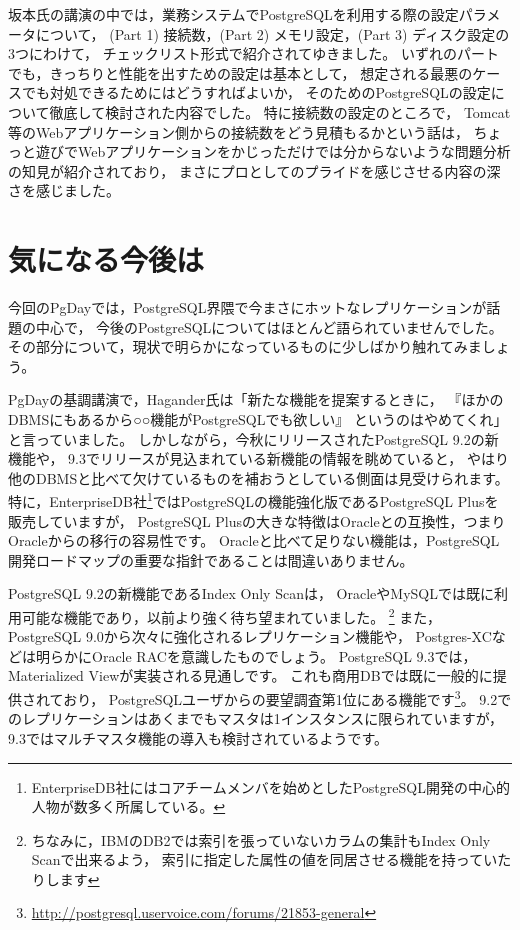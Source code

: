 坂本氏の講演の中では，業務システムでPostgreSQLを利用する際の設定パラメータについて，
(Part 1) 接続数，(Part 2) メモリ設定，(Part 3) ディスク設定の3つにわけて，
チェックリスト形式で紹介されてゆきました。
いずれのパートでも，きっちりと性能を出すための設定は基本として，
想定される最悪のケースでも対処できるためにはどうすればよいか，
そのためのPostgreSQLの設定について徹底して検討された内容でした。
特に接続数の設定のところで，
Tomcat等のWebアプリケーション側からの接続数をどう見積もるかという話は，
ちょっと遊びでWebアプリケーションをかじっただけでは分からないような問題分析の知見が紹介されており，
まさにプロとしてのプライドを感じさせる内容の深さを感じました。

\section{気になる今後は}

今回のPgDayでは，PostgreSQL界隈で今まさにホットなレプリケーションが話題の中心で，
今後のPostgreSQLについてはほとんど語られていませんでした。
その部分について，現状で明らかになっているものに少しばかり触れてみましょう。

PgDayの基調講演で，Hagander氏は「新たな機能を提案するときに，
『ほかのDBMSにもあるから○○機能がPostgreSQLでも欲しい』
というのはやめてくれ」と言っていました。
しかしながら，今秋にリリースされたPostgreSQL 9.2の新機能や，
9.3でリリースが見込まれている新機能の情報を眺めていると，
やはり他のDBMSと比べて欠けているものを補おうとしている側面は見受けられます。
特に，EnterpriseDB社\footnote{EnterpriseDB社にはコアチームメンバを始めとしたPostgreSQL開発の中心的人物が数多く所属している。}ではPostgreSQLの機能強化版であるPostgreSQL Plusを販売していますが，
PostgreSQL Plusの大きな特徴はOracleとの互換性，つまりOracleからの移行の容易性です。
Oracleと比べて足りない機能は，PostgreSQL開発ロードマップの重要な指針であることは間違いありません。

PostgreSQL 9.2の新機能であるIndex Only Scanは，
OracleやMySQLでは既に利用可能な機能であり，以前より強く待ち望まれていました。
\footnote{ちなみに，IBMのDB2では索引を張っていないカラムの集計もIndex Only Scanで出来るよう，
索引に指定した属性の値を同居させる機能を持っていたりします}
また，PostgreSQL 9.0から次々に強化されるレプリケーション機能や，
Postgres-XCなどは明らかにOracle RACを意識したものでしょう。
PostgreSQL 9.3では，Materialized Viewが実装される見通しです。
これも商用DBでは既に一般的に提供されており，
PostgreSQLユーザからの要望調査第1位にある機能です\footnote{\url{http://postgresql.uservoice.com/forums/21853-general}}。
9.2でのレプリケーションはあくまでもマスタは1インスタンスに限られていますが，
9.3ではマルチマスタ機能の導入も検討されているようです。

